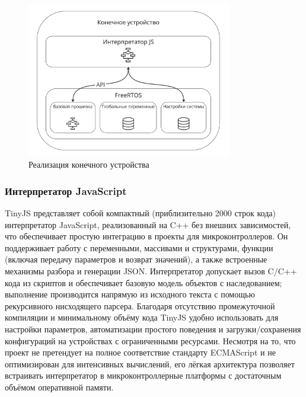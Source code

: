 \documentclass[14pt,a4paper]{extarticle}
\begin{document}
\begin{figure}[H]
    \centering
    \includegraphics[width=0.8\textwidth]{images/Fig05.png}
    \caption{Реализация конечного устройства}
    \label{fig:end_device}
\end{figure}

\subsubsection{Интерпретатор JavaScript}

TinyJS представляет собой компактный (приблизительно 2000 строк кода) интерпретатор JavaScript, реализованный на C++ без внешних зависимостей, что обеспечивает простую интеграцию
в проекты для микроконтроллеров. Он поддерживает работу с переменными, массивами и структурами, функции (включая передачу параметров и возврат значений), а также встроенные механизмы
разбора и генерации JSON. Интерпретатор допускает вызов C/C++ кода из скриптов и обеспечивает базовую модель объектов с наследованием; выполнение производится напрямую из исходного
текста с помощью рекурсивного нисходящего парсера. Благодаря отсутствию промежуточной компиляции и минимальному объёму кода TinyJS удобно использовать для настройки параметров,
автоматизации простого поведения и загрузки/сохранения конфигураций на устройствах с ограниченными ресурсами. Несмотря на то, что проект не претендует на полное соответствие стандарту
ECMAScript и не оптимизирован для интенсивных вычислений, его лёгкая архитектура позволяет встраивать интерпретатор в микроконтроллерные платформы с достаточным объёмом оперативной
памяти.


\end{document}
